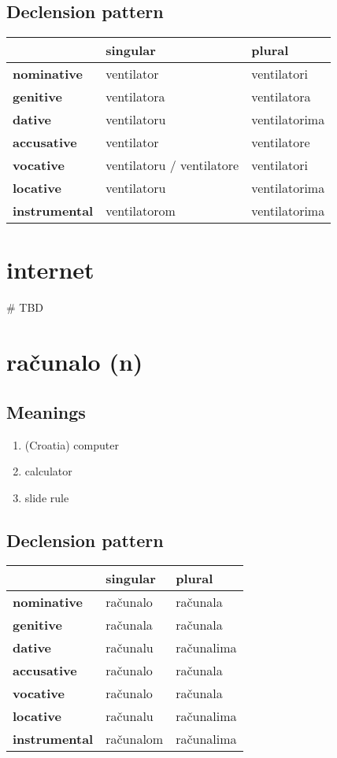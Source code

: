 \subsection*{Declension pattern}
\begin{tabularx}{\linewidth}{Xll}
\toprule
{} &                   singular &         plural \\
\midrule
\textbf{nominative  } &                 ventilator &    ventilatori \\
\textbf{genitive    } &                ventilatora &    ventilatora \\
\textbf{dative      } &                ventilatoru &  ventilatorima \\
\textbf{accusative  } &                 ventilator &    ventilatore \\
\textbf{vocative    } &  ventilatoru / ventilatore &    ventilatori \\
\textbf{locative    } &                ventilatoru &  ventilatorima \\
\textbf{instrumental} &               ventilatorom &  ventilatorima \\
\bottomrule
\end{tabularx}

\filbreak
\section{internet}
{\# TBD}
\section{računalo (n)}
\subsection*{Meanings}
\begin{enumerate}
\item (Croatia) computer
\item calculator
\item slide rule
\end{enumerate}
\subsection*{Declension pattern}
\begin{tabularx}{\linewidth}{Xll}
\toprule
{} &   singular &      plural \\
\midrule
\textbf{nominative  } &   računalo &    računala \\
\textbf{genitive    } &   računala &    računala \\
\textbf{dative      } &   računalu &  računalima \\
\textbf{accusative  } &   računalo &    računala \\
\textbf{vocative    } &   računalo &    računala \\
\textbf{locative    } &   računalu &  računalima \\
\textbf{instrumental} &  računalom &  računalima \\
\bottomrule
\end{tabularx}

